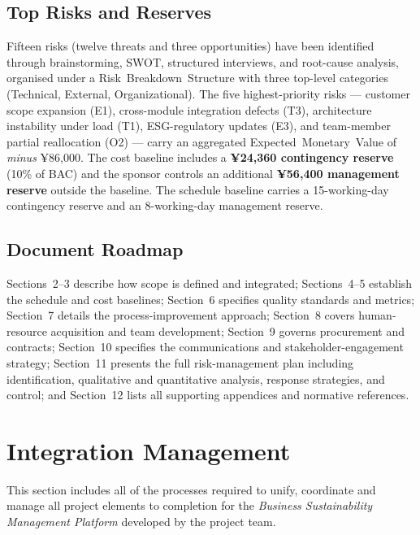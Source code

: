 \documentclass[12pt,a4paper]{article}
\begin{document}
\subsection*{Top Risks and Reserves}

Fifteen risks (twelve threats and three opportunities) have been identified through brainstorming, SWOT, structured interviews, and root-cause analysis, organised under a Risk~Breakdown~Structure with three top-level categories (Technical, External, Organizational). The five highest-priority risks --- customer scope expansion (E1), cross-module integration defects (T3), architecture instability under load (T1), ESG-regulatory updates (E3), and team-member partial reallocation (O2) --- carry an aggregated Expected~Monetary~Value of \textit{minus} ¥86{,}000. The cost baseline includes a \textbf{¥24{,}360 contingency reserve} (10\% of BAC) and the sponsor controls an additional \textbf{¥56{,}400 management reserve} outside the baseline. The schedule baseline carries a 15-working-day contingency reserve and an 8-working-day management reserve.

\subsection*{Document Roadmap}

Sections~2--3 describe how scope is defined and integrated; Sections~4--5 establish the schedule and cost baselines; Section~6 specifies quality standards and metrics; Section~7 details the process-improvement approach; Section~8 covers human-resource acquisition and team development; Section~9 governs procurement and contracts; Section~10 specifies the communications and stakeholder-engagement strategy; Section~11 presents the full risk-management plan including identification, qualitative and quantitative analysis, response strategies, and control; and Section~12 lists all supporting appendices and normative references.
\clearpage
\section{Integration Management}
This section includes all of the processes required to unify, coordinate and manage all project elements to completion for the \textit{Business Sustainability Management Platform} developed by the project team.
\end{document}
